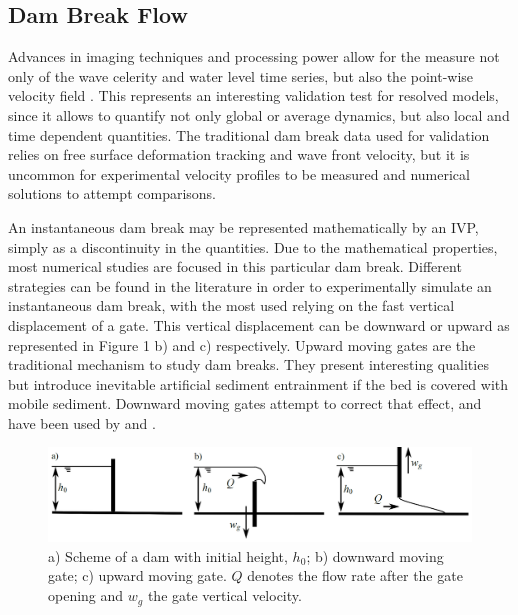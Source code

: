 \subsection{Dam Break Flow}
\label{sec:validation_dam_break}

Advances in imaging techniques and processing power allow for the measure not only of the wave celerity and water level time series, but also the point-wise velocity field \citep{aleixo-al-2011, Oertel-2012}. This represents an interesting validation test for resolved models, since it allows to quantify not only global or average dynamics, but also local and time dependent quantities. The traditional dam break data used for validation \citep{Violeau-2007, Gomez-Gesteira-2010} relies on free surface deformation tracking and wave front velocity, but it is uncommon for experimental velocity profiles to be measured and numerical solutions to attempt comparisons.

An instantaneous dam break may be represented mathematically by an \ac{IVP}, simply as a discontinuity in the quantities. Due to the mathematical properties, most numerical studies are focused in this particular dam break. Different strategies can be found in the literature in order to experimentally simulate an instantaneous dam break, with the most used relying on the fast vertical displacement of a gate. This vertical displacement can be downward or upward as represented in Figure 1 b) and c) respectively. Upward moving gates are the traditional mechanism to study dam breaks. They present interesting qualities but introduce inevitable artificial sediment entrainment if the bed is covered with mobile sediment. Downward moving gates attempt to correct that effect, and have been used by \cite{Spinewine-2007} and \cite{Aleixo-2013}.

%
\begin{figure}[ht!]
	\centering
	\includegraphics[width=0.90\linewidth]{Figures/5.Chapter/gate_comp}
	\caption{a) Scheme of a dam with initial height, $h_0$; b) downward moving gate; c) upward moving gate. $Q$ denotes the flow rate after the gate opening and $w_g$ the gate vertical velocity.}
	\label{fig:dam_squeme} 
\end{figure}
%

